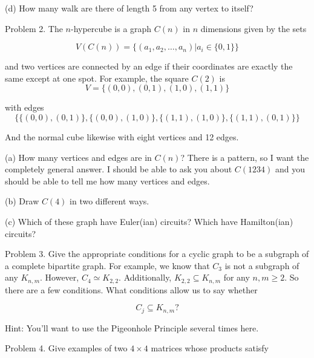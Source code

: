 \documentclass[16 pt]{amsart}
\theoremstyle{definition}
\theoremstyle{remark}
\numberwithin{equation}{subsection}
\begin{document}
\vspace{.25in}

(d) How many walk are there of length 5 from any vertex to itself?


\newpage

Problem 2. The $n$-hypercube is a graph $C(n)$ in $n$ dimensions given by the sets

\[
V(C(n)) = \{(a_1,a_2,\dots, a_n) | a_i \in \{0,1\} \}
\]

and two vertices are connected by an edge if their coordinates are exactly the same except at one spot.  For example, the square $C(2)$ is
\[
V = \{(0,0),(0,1),(1,0),(1,1)\}
\]

with edges
\[
\{\{(0,0),(0,1)\}, \{(0,0),(1,0)\},\{(1,1),(1,0)\},\{(1,1),(0,1)\}\} 
\]

And the normal cube likewise with eight vertices and 12 edges.

\vspace{.25in}

(a) How many vertices and edges are in $C(n)$? There is a pattern, so I want the completely general answer.  I should be able to ask you about $C(1234)$ and you should be able to tell me how many vertices and edges. 

\vspace{.25in}

(b) Draw $C(4)$ in two different ways.

\vspace{.25in}

(c) Which of these graph have Euler(ian) circuits? Which have Hamilton(ian) circuits?



\newpage

Problem 3. Give the appropriate conditions for a cyclic graph to be a subgraph of a complete bipartite graph.  For example, we know that $C_3$ is not a subgraph of any $K_{n,m}$.  However, $C_4 \simeq K_{2,2}$.  Additionally, $K_{2,2} \subseteq K_{n,m}$ for any $n,m \ge 2$.  So there are a few conditions.  What conditions allow us to say whether

\[
C_j \subseteq K_{n,m}?
\]

\vspace{.25in}

Hint: You'll want to use the Pigeonhole Principle several times here.

\newpage

Problem 4. Give examples of two $4\times 4$ matrices whose products satisfy
\end{document}

